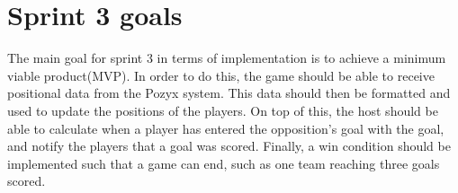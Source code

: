 \section{Sprint 3 goals}
The main goal for sprint 3 in terms of implementation is to achieve a minimum viable product(MVP).
In order to do this, the game should be able to receive positional data from the Pozyx system.
This data should then be formatted and used to update the positions of the players.
On top of this, the host should be able to calculate when a player has entered the opposition's goal with the goal, and notify the players that a goal was scored.
Finally, a win condition should be implemented such that a game can end, such as one team reaching three goals scored.
